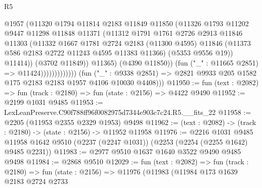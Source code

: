 \begin{lexlean}{R5}
\begin{coremodule}
                                    @1957
                                    (@11320
                                      @1794
                                      @11814
                                      @2183
                                      @11849
                                      @11850
                                      (@11326
                                        @1793
                                        @11202
                                        @9447
                                        @11298
                                        @11848
                                        @11371
                                        (@11312
                                          @1791
                                          @1761
                                          @2726
                                          @2913
                                          @11846
                                          @11303
                                          (@11332
                                            @1667
                                            @1781
                                            @2724
                                            @2183
                                            (@11300 @4595)
                                            @11846
                                            (@11373 @586 @2183 @2722 @11243 @4595 @11383 @11366)
                                            (@5353 @9556 @19))
                                          @11414))
                                      (@3702 @11849))
                                    @11365)
                                  (@4390 @11850))
                                (fun ("_" : @11665 @2851) => @11424)))))))))))))
        (fun ("_" : @9338 @2851) =>
        @2821 @9933 @205 @1582 @175 @2183 @2183 @1957 @4106 @10030 @4408)))
@11950 := fun (text : @2082) => fun (track : @2180) => fun (state : @2156) => @4422 @9490
@11952 := @2199 @1031 @9485
@11953 := LexLeanPreserve.C90f788ff96f0082975d7344e903c7c24.R5.__fits_22
@11958 := @2205 (@11953 @2355 @2329 @1953) @9498
@11962 := (text : @2082) -> (track : @2180) -> (state : @2156) -> @11952 @11958
@11976 := @2216
    @1031
    @9485
    @11958
    @1642
    @9510
    (@2237 (@2247 @1031))
    (@2253 (@2254 (@2255 @1642) @9485 @2231))
@11983 := @2977 @9510 @1637 @1640 @3522 @9490 @9485 @9498
@11984 := @2868 @9510
@12029 := fun (text : @2082) =>
  fun (track : @2180) =>
  fun (state : @2156) =>
  @11976
    (@11983
      (@11984
        @173
        @1639
        @2183
        @2724
        @2733

\end{coremodule}
\end{lexlean}
